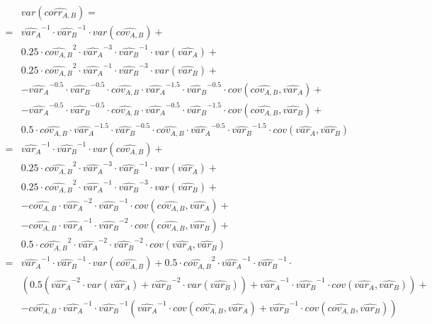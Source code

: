 \[
\begin{split}
&var\left(\hat{corr_{A,B}}\right)=\\
=&\hat{var_{A}}^{-1} \cdot \hat{var_{B}}^{-1}\cdot var\left(\hat{cov_{A,B}} \right)+\\
& 0.25 \cdot \hat{cov_{A,B}}^2\cdot \hat{var_{A}}^{-3} \cdot \hat{var_{B}}^{-1}\cdot var\left(\hat{var_{A}} \right)+\\
& 0.25 \cdot \hat{cov_{A,B}}^2\cdot \hat{var_{A}}^{-1} \cdot \hat{var_{B}}^{-3}\cdot var\left(\hat{var_{B}} \right)+\\
& - \hat{var_{A}}^{-0.5} \cdot \hat{var_{B}}^{-0.5} \cdot \hat{cov_{A,B}}\cdot \hat{var_{A}}^{-1.5} \cdot \hat{var_{B}}^{-0.5} \cdot cov\left(\hat{cov_{A,B}},\hat{var_{A}}\right)+\\
& - \hat{var_{A}}^{-0.5} \cdot \hat{var_{B}}^{-0.5} \cdot \hat{cov_{A,B}}\cdot \hat{var_{A}}^{-0.5} \cdot \hat{var_{B}}^{-1.5} \cdot cov\left(\hat{cov_{A,B}},\hat{var_{B}}\right)+\\
& 0.5 \cdot \hat{cov_{A,B}}\cdot \hat{var_{A}}^{-1.5} \cdot \hat{var_{B}}^{-0.5}\cdot \hat{cov_{A,B}}\cdot \hat{var_{A}}^{-0.5} \cdot \hat{var_{B}}^{-1.5}\cdot cov\left(\hat{var_{A}},\hat{var_{B}}\right)\\
=&\hat{var_{A}}^{-1} \cdot \hat{var_{B}}^{-1}\cdot var\left(\hat{cov_{A,B}} \right)+\\
& 0.25 \cdot \hat{cov_{A,B}}^2\cdot \hat{var_{A}}^{-3} \cdot \hat{var_{B}}^{-1}\cdot var\left(\hat{var_{A}} \right)+\\
& 0.25 \cdot \hat{cov_{A,B}}^2\cdot \hat{var_{A}}^{-1} \cdot \hat{var_{B}}^{-3}\cdot var\left(\hat{var_{B}} \right)+\\
& - \hat{cov_{A,B}} \cdot \hat{var_{A}}^{-2} \cdot \hat{var_{B}}^{-1} \cdot cov\left(\hat{cov_{A,B}},\hat{var_{A}}\right)+\\
& - \hat{cov_{A,B}} \cdot \hat{var_{A}}^{-1} \cdot \hat{var_{B}}^{-2} \cdot cov\left(\hat{cov_{A,B}},\hat{var_{B}}\right)+\\
& 0.5 \cdot \hat{cov_{A,B}}^2\cdot \hat{var_{A}}^{-2} \cdot \hat{var_{B}}^{-2}\cdot cov\left(\hat{var_{A}},\hat{var_{B}}\right)\\
=&\hat{var_{A}}^{-1} \cdot \hat{var_{B}}^{-1}\cdot var\left(\hat{cov_{A,B}} \right)+0.5 \cdot \hat{cov_{A,B}}^2\cdot \hat{var_{A}}^{-1} \cdot \hat{var_{B}}^{-1}\cdot \\
&\left(0.5 \left ( \hat{var_{A}}^{-2}\cdot var\left(\hat{var_{A}} \right)+\hat{var_{B}}^{-2}\cdot var\left(\hat{var_{B}} \right)    \right) +  \hat{var_{A}}^{-1} \cdot \hat{var_{B}}^{-1}\cdot cov\left(\hat{var_{A}},\hat{var_{B}}\right) \right)+\\
& - \hat{cov_{A,B}} \cdot \hat{var_{A}}^{-1} \cdot \hat{var_{B}}^{-1}\left(\hat{var_{A}}^{-1} \cdot cov\left(\hat{cov_{A,B}},\hat{var_{A}}\right)+\hat{var_{B}}^{-1}\cdot cov\left(\hat{cov_{A,B}},\hat{var_{B}}\right) \right)
\end{split}
\]

